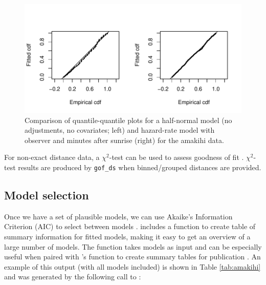\documentclass[article]{jss}
\begin{document}
\begin{CodeChunk}
\begin{figure}

{\centering \includegraphics{paper_files/figure-latex/amakihi-qq-comp-1} 

}

\caption[Comparison of quantile-quantile plots for a half-normal model (no adjustments, no covariates]{Comparison of quantile-quantile plots for a half-normal model (no adjustments, no covariates; left) and hazard-rate model with observer and minutes after sunrise (right) for the amakihi data.\label{amakihi-qq}}\label{fig:amakihi-qq-comp}
\end{figure}
\end{CodeChunk}

For non-exact distance data, a \(\chi^2\)-test can be used to assess
goodness of fit \citep[see][Section 3.4.4]{Buckland:2001vm}.
\(\chi^2\)-test results are produced by \texttt{gof\_ds} when
binned/grouped distances are provided.

\subsection{Model selection}\label{model-selection}

Once we have a set of plausible models, we can use Akaike's Information
Criterion (AIC) to select between models \citep[see
e.g.][]{burnham2003model}.  includes a function to create
table of summary information for fitted models, making it easy to get an
overview of a large number of models. The 
function takes models as input and can be especially useful when paired
with 's  function to create summary tables for
publication \citep{knitr-pkg}. An example of this output (with all
models included) is shown in Table \ref{tab:amakihi} and was generated
by the following call to :
\end{document}

